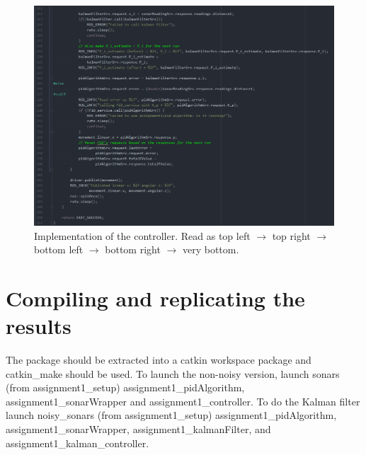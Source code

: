 \documentclass{article}
\begin{document}
\newpage
\begin{figure}[ht]
    \centering
    \includegraphics[scale=0.24]{img/controller5.png}
    \caption{Implementation of the controller. Read as top left $\rightarrow$
    top right $\rightarrow$  
    bottom left $\rightarrow$ bottom right $\rightarrow$ very bottom.}
    \label{controllerImplement}
\end{figure}
\section{Compiling and replicating the results}
The package should be extracted into a catkin workspace package and catkin\_make
should be used. To launch the non-noisy version, launch sonars (from
assignment1\_setup) assignment1\_pidAlgorithm, assignment1\_sonarWrapper and 
assignment1\_controller. To do the Kalman filter launch noisy\_sonars (from
assignment1\_setup) assignment1\_pidAlgorithm, assignment1\_sonarWrapper,
assignment1\_kalmanFilter, and assignment1\_kalman\_controller. 
\newpage


\end{document}
